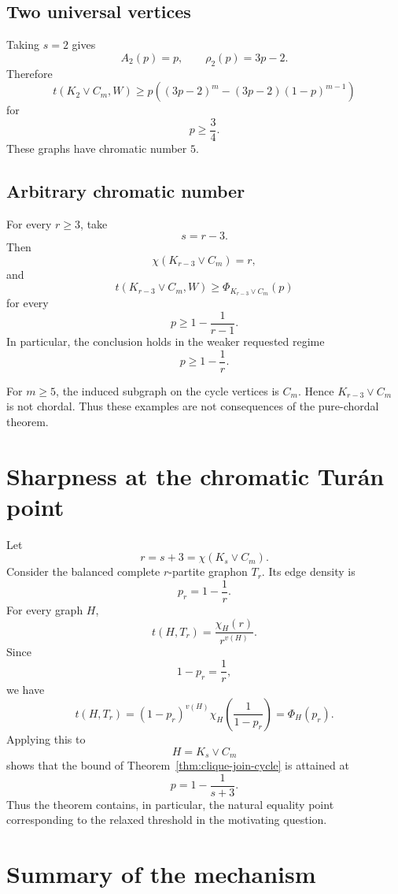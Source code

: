 \documentclass[11pt]{article}
\newcommand{\1}{\mathbf{1}}
\newcommand{\join}{\vee}
\begin{document}
\subsection{Two universal vertices}

Taking $s=2$ gives
\[
A_2(p)=p,
\qquad
\rho_2(p)=3p-2.
\]
Therefore
\[
t(K_2\join C_m,W)
\ge
p\left(
(3p-2)^m
-
(3p-2)(1-p)^{m-1}
\right)
\]
for
\[
p\ge\frac34.
\]
These graphs have chromatic number $5$.

\subsection{Arbitrary chromatic number}

For every $r\ge3$, take
\[
s=r-3.
\]
Then
\[
\chi(K_{r-3}\join C_m)=r,
\]
and
\[
t(K_{r-3}\join C_m,W)
\ge
\Phi_{K_{r-3}\join C_m}(p)
\]
for every
\[
p\ge
1-\frac1{r-1}.
\]
In particular, the conclusion holds in the weaker requested regime
\[
p\ge1-\frac1r.
\]

For $m\ge5$, the induced subgraph on the cycle vertices is $C_m$.
Hence $K_{r-3}\join C_m$ is not chordal.
Thus these examples are not consequences of the pure-chordal theorem.


\section{Sharpness at the chromatic Tur\'an point}

Let
\[
r=s+3=\chi(K_s\join C_m).
\]
Consider the balanced complete $r$-partite graphon $T_r$.
Its edge density is
\[
p_r=1-\frac1r.
\]
For every graph $H$,
\[
t(H,T_r)
=
\frac{\chi_H(r)}{r^{v(H)}}.
\]
Since
\[
1-p_r=\frac1r,
\]
we have
\[
t(H,T_r)
=
(1-p_r)^{v(H)}
\chi_H\!\left(\frac1{1-p_r}\right)
=
\Phi_H(p_r).
\]
Applying this to
\[
H=K_s\join C_m
\]
shows that the bound of
Theorem~\ref{thm:clique-join-cycle}
is attained at
\[
p=1-\frac1{s+3}.
\]
Thus the theorem contains, in particular, the natural equality point
corresponding to the relaxed threshold in the motivating question.


\section{Summary of the mechanism}
\end{document}
